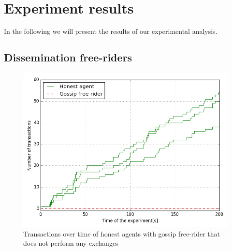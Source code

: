 \section{Experiment results}
In the following we will present the results of our experimental analysis.
\subsection{Dissemination free-riders}


\begin{figure}
  \centering
  \includegraphics[width=.6\linewidth]{images/gossip_free-rider}
  \caption{Transactions over time of honest agents with gossip free-rider that does not 
  perform any exchanges}
  \label{fig:DFR_no_exchanges}
\end{figure}

